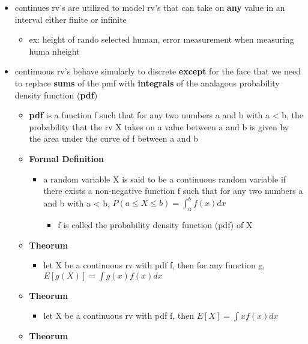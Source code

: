 \documentclass[
]{article}
\providecommand{\tightlist}{%
  \setlength{\itemsep}{0pt}\setlength{\parskip}{0pt}}
\begin{document}
\begin{itemize}
\tightlist
\item
  continues rv's are utilized to model rv's that can take on
  \textbf{any} value in an interval either finite or infinite

  \begin{itemize}
  \tightlist
  \item
    ex: height of rando selected human, error measurement when measuring
    huma nheight
  \end{itemize}
\item
  continuous rv's behave simularly to discrete \textbf{except} for the
  face that we need to replace \textbf{sums} of the pmf with
  \textbf{integrals} of the analagous probability density function
  (\textbf{pdf})

  \begin{itemize}
  \tightlist
  \item
    \textbf{pdf} is a function f such that for any two numbers a and b
    with a \textless{} b, the probability that the rv X takes on a value
    between a and b is given by the area under the curve of f between a
    and b
  \item
    \textbf{Formal Definition}

    \begin{itemize}
    \tightlist
    \item
      a random variable X is said to be a continuous random variable if
      there exists a non-negative function f such that for any two
      numbers a and b with a \textless{} b,
      \(P(a \leq X \leq b) = \int_{a}^{b}f(x)dx\)

      \begin{itemize}
      \tightlist
      \item
        f is called the probability density function (pdf) of X
      \end{itemize}
    \end{itemize}
  \item
    \textbf{Theorum}

    \begin{itemize}
    \tightlist
    \item
      let X be a continuous rv with pdf f, then for any function g,
      \(E[g(X)] = \int g(x)f(x)dx\)
    \end{itemize}
  \item
    \textbf{Theorum}

    \begin{itemize}
    \tightlist
    \item
      let X be a continuous rv with pdf f, then \(E[X] = \int xf(x)dx\)
    \end{itemize}
  \item
    \textbf{Theorum}


\end{itemize}
\end{itemize}
\end{document}
